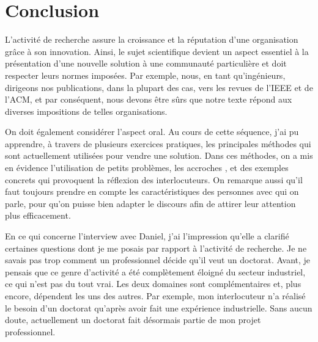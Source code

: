\documentclass{article}
\begin{document}
\section{Conclusion}

L'activité de recherche assure la croissance et la réputation d'une organisation
grâce à son innovation. Ainsi, le sujet scientifique devient un aspect essentiel
à la présentation d'une nouvelle solution à une communauté particulière et doit
respecter leurs normes imposées. Par exemple, nous, en tant qu'ingénieurs,
dirigeons nos publications, dans la plupart des cas, vers les revues de l'IEEE
et de l'ACM, et par conséquent, nous devons être sûrs que notre texte répond aux
diverses impositions de telles organisations.

\vspace{12pt}

On doit également considérer l'aspect oral. Au cours de cette séquence, j'ai pu
apprendre, à travers de plusieurs exercices pratiques, les principales méthodes
qui sont actuellement utilisées pour vendre une solution. Dans ces méthodes, on
a mis en évidence l'utilisation de petits problèmes, les \og accroches \fg, et
des exemples concrets qui provoquent la réflexion des interlocuteurs. On
remarque aussi qu'il faut toujours prendre en compte les caractéristiques des
personnes avec qui on parle, pour qu'on puisse bien adapter le discours afin de
attirer leur attention plus efficacement.

\vspace{12pt} 

En ce qui concerne l'interview avec Daniel, j'ai l'impression qu'elle a
clarifié certaines questions dont je me posais par rapport à l'activité de
recherche. Je ne savais pas trop comment un professionnel décide qu'il veut un
doctorat. Avant, je pensais que ce genre d'activité a été complètement éloigné
du secteur industriel, ce qui n'est pas du tout vrai. Les deux domaines sont
complémentaires et, plus encore, dépendent les uns des autres. Par exemple, mon
interlocuteur n'a réalisé le besoin d'un doctorat qu'après avoir fait une
expérience industrielle. Sans aucun doute, actuellement un doctorat fait
désormais partie de mon projet professionnel.
\end{document}
